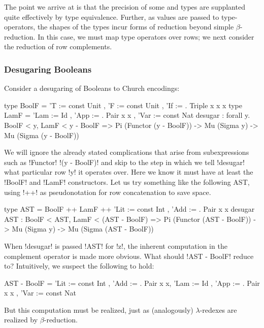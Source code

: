 \documentclass[sigplan,10pt,review]{acmart}\settopmatter{printfolios=true,printccs=false,printacmref=false}
\begin{document}
The point we arrive at is that the precision of some \RO and \Rome types are supplanted quite effectively by type equivalence. Further, as values are passed to type-operators, the shapes of the types incur forms of reduction beyond simple $\beta$-reduction. In this case, we must map type operators over rows; we next consider the reduction of row complements.


\subsubsection{Desugaring Booleans} Consider a desugaring of Booleans to Church encodings:

\begin{rosi}
type BoolF = { 'T := const Unit , 
               'F := const Unit , 
               'If := \x. Triple x x x}
type LamF  = { 'Lam := Id , 
               'App := \x. Pair x x , 
               'Var := const Nat }
desugar : forall y. BoolF < y, LamF < y - BoolF =>
          Pi (Functor (y - BoolF)) -> 
          Mu (Sigma y) -> 
          Mu (Sigma (y - BoolF))
\end{rosi}

We will ignore the already stated complications that arise from subexpressions such as !Functor! !(y - BoolF)! and skip to the step in which we tell !desugar! what particular row !y! it operates over. Here we know it must have at least the !BoolF! and !LamF! constructors. Let us try something like the following AST, using !++! as pseudonotation for row concatenation to save space.

\begin{rosi}
type AST = BoolF ++ LamF ++ 
          {'Lit := const Int , 'Add := \x. Pair x x }
desugar AST : BoolF < AST, LamF < (AST - BoolF) =>
              Pi (Functor (AST - BoolF)) -> 
              Mu (Sigma y) -> Mu (Sigma (AST - BoolF))
\end{rosi}

\Ni When !desugar! is passed !AST! for !z!, the inherent computation in the complement operator is made more obvious. What should !AST - BoolF! reduce to? Intuitively, we suspect the following to hold: 

\begin{rosi} 
AST - BoolF = {'Lit := const Int , 
               'Add := \x. Pair x x, 
               'Lam := Id , 
               'App := \x. Pair x x , 
               'Var := const Nat }
\end{rosi}

\Ni But this computation must be realized, just as (analogously) $\lambda$-redexes are realized by $\beta$-reduction.
\end{document}
